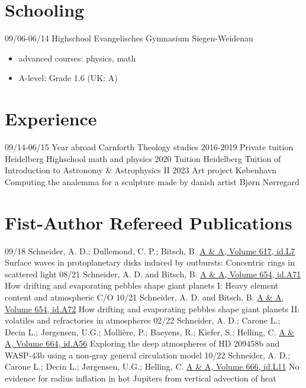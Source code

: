 \documentclass[]{friggeri-cv}
\begin{document}
\section{Schooling}
\begin{entrylist}
  \entry
    {09/06-06/14}
    {Highschool}
    {Evangelisches Gymnasium Siegen-Weidenau}
    {\begin{itemize}\vspace{-3mm}
		\item advanced courses: physics, math
		\item A-level: Grade 1.6 (UK: A)
	\end{itemize}}
\end{entrylist}
\section{Experience}
\begin{entrylist}
	\entry
    {09/14-06/15}
    {Year abroad}
    {Carnforth}
    {Theology studies}
	\entry
    {2016-2019}
    {Private tuition}
    {Heidelberg}
    {Highschool math and physics}
    \entry
    {2020}
    {Tuition}
    {Heidelberg}
    {Tuition of Introduction to Astronomy \& Astrophysics II}
    \entry
    {2023}
    {Art project}
    {K{\o}benhavn}
    {Computing the analemma for a sculpture made by danish artist Bj{\o}rn N{\o}rregard}

\end{entrylist}
\newpage
\section{Fist-Author Refereed Publications}
\begin{entrylist}
  \entry
    {09/18}
    {Schneider, A. D.; Dullemond, C. P.; Bitsch, B.}
    {\href{https://arxiv.org/abs/1809.02834}{A \& A, Volume 617, id.L7}}
    {Surface waves in protoplanetary disks induced by outbursts: Concentric rings in scattered light}
  \entry
    {08/21}
    {Schneider, A. D. and Bitsch, B.}
    {\href{https://arxiv.org/abs/2105.13267}{A \& A, Volume 654, id.A71}}
    {How drifting and evaporating pebbles shape giant planets I: Heavy element content and atmospheric C/O}
  \entry
    {10/21}
    {Schneider, A. D. and Bitsch, B.}
    {\href{https://arxiv.org/abs/2109.03589}{A \& A, Volume 654, id.A72}}
    {How drifting and evaporating pebbles shape giant planets II: volatiles and refractories in atmospheres}
  \entry
    {02/22}
    {Schneider, A. D.; Carone L.; Decin L.; Jørgensen, U.G.; Mollière, P.; Baeyens, R.; Kiefer, S.; Helling, C.}
    {\href{https://arxiv.org/abs/2202.09183}{A \& A, Volume 664, id.A56}}
    {Exploring the deep atmospheres of HD 209458b and WASP-43b using a non-gray general circulation model}    
  \entry
    {10/22}
    {Schneider, A. D.; Carone L.; Decin L.; Jørgensen, U.G.; Helling, C.}
    {\href{https://arxiv.org/abs/2210.01466}{A \& A, Volume 666, id.L11}}
    {No evidence for radius inflation in hot Jupiters from vertical advection of heat}    
\end{entrylist}
\end{document}
